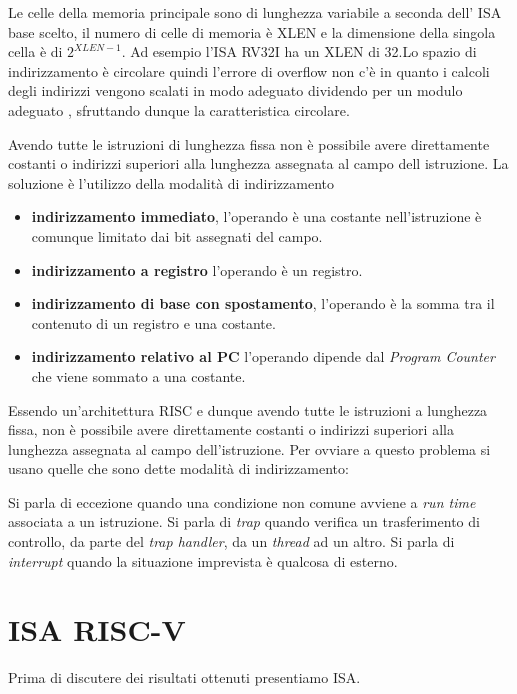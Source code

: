 \documentclass[12pt,a4paper]{report}
\begin{document}
Le celle della memoria principale sono di lunghezza variabile a seconda dell' ISA base scelto, il numero di celle di memoria è XLEN e la dimensione della singola cella è di $2^{XLEN - 1}$. Ad esempio l'ISA RV32I ha un XLEN di 32.Lo spazio di indirizzamento è circolare quindi l'errore di overflow non c'è in quanto i calcoli degli indirizzi vengono scalati in modo adeguato dividendo per un modulo adeguato , sfruttando dunque la caratteristica circolare.

Avendo tutte le istruzioni di lunghezza fissa non è possibile avere direttamente costanti o indirizzi superiori alla lunghezza assegnata al campo dell istruzione. La soluzione è l'utilizzo della modalità di indirizzamento
\begin{itemize}
	\item \textbf{indirizzamento immediato}, l’operando è una costante nell’istruzione è comunque limitato dai bit assegnati del campo.
	\item \textbf{indirizzamento a registro} l’operando è un registro.
	\item \textbf{indirizzamento di base con spostamento}, l’operando è la somma tra il
contenuto di un registro e una costante.
\item \textbf{indirizzamento relativo al PC} l'operando dipende dal \textit{Program Counter} che viene sommato a una costante.
\end{itemize}

Essendo un’architettura RISC e dunque avendo tutte le istruzioni a lunghezza fissa, non è possibile avere direttamente costanti o indirizzi superiori alla lunghezza assegnata al campo dell’istruzione. Per ovviare a questo problema si usano quelle che sono dette modalità di indirizzamento:

Si parla di eccezione quando una condizione non comune avviene a \textit{run time} associata a un istruzione.
Si parla di \textit{trap} quando verifica un trasferimento di controllo, da parte del \textit{trap handler}, da un  \textit{thread} ad un altro. Si parla di \textit{interrupt} quando la situazione imprevista è qualcosa di esterno.


% 
\chapter{ISA RISC-V}
Prima di discutere dei risultati ottenuti presentiamo ISA. 
\end{document}
